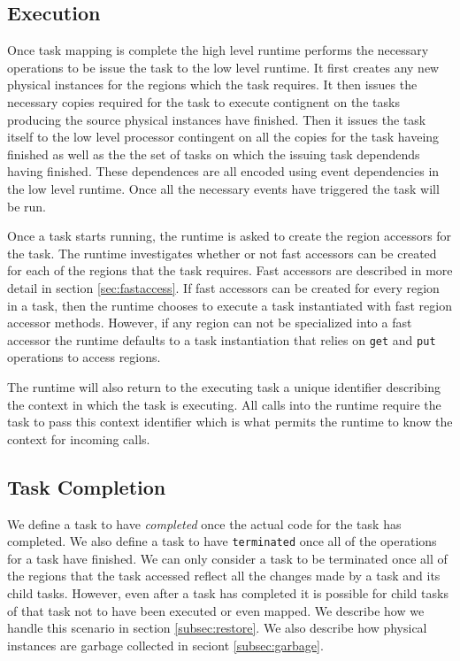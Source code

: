 \subsection{Execution}
\label{subsec:execution}
Once task mapping is complete the high level runtime performs the necessary operations
to be issue the task to the low level runtime.  It first creates any new physical instances
for the regions which the task requires.  It then issues the necessary copies required
for the task to execute contignent on the tasks producing the source physical instances
have finished.  Then it issues the task itself to the low level processor contingent
on all the copies for the task haveing finished as well as the the set of tasks
on which the issuing task dependends having finished.  These dependences are all encoded
using event dependencies in the low level runtime.  Once all the necessary events
have triggered the task will be run.

Once a task starts running, the runtime is asked to create the region accessors for
the task.  The runtime investigates whether or not fast accessors can be created for
each of the regions that the task requires.  Fast accessors are described in more
detail in section \ref{sec:fastaccess}.  If fast accessors can be created for every
region in a task, then the runtime chooses to execute a task instantiated with fast
region accessor methods.  However, if any region can not be specialized into a fast
accessor the runtime defaults to a task instantiation that relies on {\tt get} and
{\tt put} operations to access regions.

The runtime will also return to the executing task a unique identifier describing the
context in which the task is executing.  All calls into the runtime require the task
to pass this context identifier which is what permits the runtime to know the context
for incoming calls.  

\subsection{Task Completion}
\label{subsec:cleanup}
We define a task to have {\em completed} once the actual code for the task has completed.
We also define a task to have {\tt terminated} once all of the operations for a task
have finished.  We can only consider a task to be terminated once all of the regions that
the task accessed reflect all the changes made by a task and its child tasks.  However,
even after a task has completed it is possible for child tasks of that task
not to have been executed or even mapped.  We describe how we handle this scenario in
section \ref{subsec:restore}.  We also describe how physical instances are garbage
collected in seciont \ref{subsec:garbage}.

